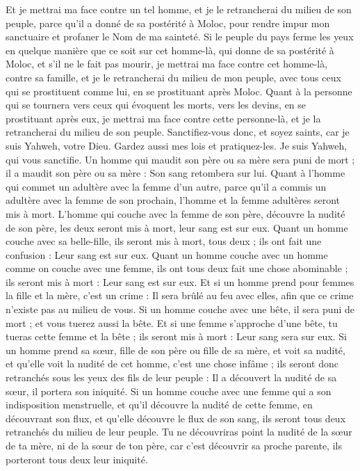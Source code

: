 \begin{multicols}{2}
Et je mettrai ma face contre un tel homme, et je le retrancherai du milieu de son peuple, parce qu'il a donné de sa postérité à Moloc, pour rendre impur mon sanctuaire et profaner le Nom de ma sainteté.
Si le peuple du pays ferme les yeux en quelque manière que ce soit sur cet homme-là, qui donne de sa postérité à Moloc, et s'il ne le fait pas mourir,
je mettrai ma face contre cet homme-là, contre sa famille, et je le retrancherai du milieu de mon peuple, avec tous ceux qui se prostituent comme lui, en se prostituant après Moloc.
Quant à la personne qui se tournera vers ceux qui évoquent les morts, vers les devins, en se prostituant après eux, je mettrai ma face contre cette personne-là, et je la retrancherai du milieu de son peuple.
Sanctifiez-vous donc, et soyez saints, car je suis Yahweh, votre Dieu.
Gardez aussi mes lois et pratiquez-les. Je suis Yahweh, qui vous sanctifie.
Un homme qui maudit son père ou sa mère sera puni de mort ; il a maudit son père ou sa mère : Son sang retombera sur lui.
Quant à l'homme qui commet un adultère avec la femme d'un autre, parce qu'il a commis un adultère avec la femme de son prochain, l'homme et la femme adultères seront mis à mort.
L'homme qui couche avec la femme de son père, découvre la nudité de son père, les deux seront mis à mort, leur sang est sur eux.
Quant un homme couche avec sa belle-fille, ils seront mis à mort, tous deux ; ils ont fait une confusion : Leur sang est sur eux.
Quant un homme couche avec un homme comme on couche avec une femme, ils ont tous deux fait une chose abominable ; ils seront mis à mort : Leur sang est sur eux.
Et si un homme prend pour femmes la fille et la mère, c'est un crime : Il sera brûlé au feu avec elles, afin que ce crime n'existe pas au milieu de vous.
Si un homme couche avec une bête, il sera puni de mort ; et vous tuerez aussi la bête.
Et si une femme s'approche d'une bête, tu tueras cette femme et la bête ; ils seront mis à mort : Leur sang sera sur eux.
Si un homme prend sa sœur, fille de son père ou fille de sa mère, et voit sa nudité, et qu'elle voit la nudité de cet homme, c'est une chose infâme ; ils seront donc retranchés sous les yeux des fils de leur peuple : Il a découvert la nudité de sa sœur, il portera son iniquité.
Si un homme couche avec une femme qui a son indisposition menstruelle, et qu'il découvre la nudité de cette femme, en découvrant son flux, et qu'elle découvre le flux de son sang, ils seront tous deux retranchés du milieu de leur peuple.
Tu ne découvriras point la nudité de la sœur de ta mère, ni de la sœur de ton père, car c'est découvrir sa proche parente, ils porteront tous deux leur iniquité.

\end{multicols}
